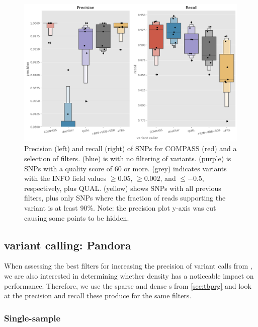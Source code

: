 \begin{figure}
\begin{center}
\includegraphics[width=0.90\columnwidth]{Chapter2/Figs/bcftools-precision-recall-filters.png}
\caption{{Precision (left) and recall (right) of SNPs for COMPASS (red) and a selection of \bcftools{} filters.  (blue) is \bcftools{} with no filtering of variants.  (purple) is \bcftools{} SNPs with a quality score of 60 or more.  (grey) indicates \bcftools{} variants with the INFO field values $\ge 0.05$, $\ge 0.002$, and $\le -0.5$, respectively, plus QUAL.  (yellow) shows \bcftools{} SNPs with all previous filters, plus only SNPs where the fraction of reads supporting the variant is at least 90\%. Note: the precision plot y-axis was cut causing some  points to be hidden.
{\label{fig:bcftools-filters}}
}}
\end{center}
\end{figure}

\subsection{\ont{} variant calling: Pandora}
\label{sec:pandora-filters}

When assessing the best filters for increasing the precision of variant calls from \pandora{}, we are also interested in determining whether \panrg{} density has a noticeable impact on performance. Therefore, we use the sparse and dense \panrg{}s from \autoref{sec:tbprg} and look at the precision and recall these produce for the same filters.

\subsubsection{Single-sample}
\label{sec:map-var-calls}

